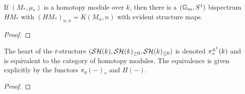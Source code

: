 \documentclass{amsart}%
\begin{document}
\begin{lemma}
  If $(M_*, \mu_*)$ is a homotopy module over $k$, then there is a
  $(\mathbb{G}_m, S^1)$ bispectrum $HM_*$ with $(HM_*)_{n,n} = K(M_n,n)$
  with evident structure maps. 
\end{lemma}

\begin{proof}
  
\end{proof}

\begin{theorem}
  The heart of the $t$-structure
  $(\mathcal{SH}(k), \mathcal{SH}(k)_{\geq 0}, \mathcal{SH}(k)_{\leq 0})$ is denoted
  $\pi^{\mathbb{A}^1}_*(k)$ and is equivalent to the category of homotopy
  modules. The equivalence is given explicitly by the functors
  $\pi_0(-)_*$ and $H(-)$. 
\end{theorem}

\begin{proof}
  
\end{proof}
\end{document}
